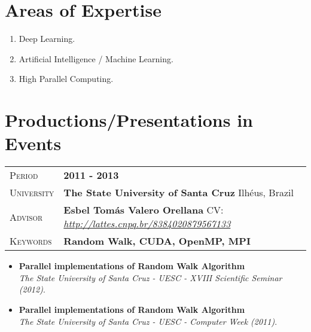 \documentclass[10pt, a4paper, oneside, final]{scrartcl} %
\newcommand{\gray}{\rowcolor[gray]{.90}} %
\begin{document}

\section{Areas of Expertise}

\begin{enumerate}\itemsep1.5pt
\item Deep Learning.
\item Artificial Intelligence / Machine Learning.
\item High Parallel Computing.
\end{enumerate}


\section{Productions/Presentations in Events}

\begin{center}
\begin{tabularx}{1.0\linewidth}{>{\raggedleft\scshape}p{2.34cm}X}
\gray Period & \textbf{2011 - 2013}\\
\gray University & \textbf{The State University of Santa Cruz} \hfill Ilhéus, Brazil\\
\gray Advisor & \textbf{Esbel Tomás Valero Orellana} \hfill CV: \hyperref[Esbel Valero]{\textit{http://lattes.cnpq.br/8384020879567133}}\\
\gray Keywords & \textbf{Random Walk, CUDA, OpenMP, MPI}
\end{tabularx}
\end{center}

\begin{itemize}\itemsep1.5pt
\item \textbf{Parallel implementations of Random Walk Algorithm} \\ 
      \textit{The State University of Santa Cruz - UESC - XVIII Scientific Seminar (2012)}.
      
\item \textbf{Parallel implementations of Random Walk Algorithm} \\ 
      \textit{The State University of Santa Cruz - UESC - Computer Week (2011)}.
\end{itemize}
\end{document}
